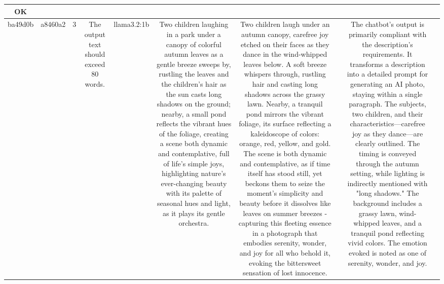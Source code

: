 \begin{table}[h!]
\begin{tabular}{|c|c|c|c|c|c|c|c|c|c|}
OK & \\
\hline
ba49d0b & a8460a2 & 3 & The output text should exceed 80 words. & llama3.2:1b & Two children laughing in a park under a canopy of colorful autumn leaves as a gentle breeze sweeps by, rustling the leaves and the children's hair as the sun casts long shadows on the ground; nearby, a small pond reflects the vibrant hues of the foliage, creating a scene both dynamic and contemplative, full of life's simple joys, highlighting nature's ever-changing beauty with its palette of seasonal hues and light, as it plays its gentle orchestra. & Two children laugh under an autumn canopy, carefree joy etched on their faces as they dance in the wind-whipped leaves below. A soft breeze whispers through, rustling hair and casting long shadows across the grassy lawn. Nearby, a tranquil pond mirrors the vibrant foliage, its surface reflecting a kaleidoscope of colors: orange, red, yellow, and gold. The scene is both dynamic and contemplative, as if time itself has stood still, yet beckons them to seize the moment's simplicity and beauty before it dissolves like leaves on summer breezes - capturing this fleeting essence in a photograph that embodies serenity, wonder, and joy for all who behold it, evoking the bittersweet sensation of lost innocence. &  & The chatbot's output is primarily compliant with the description's requirements. It transforms a description into a detailed prompt for generating an AI photo, staying within a single paragraph. The subjects, two children, and their characteristics—carefree joy as they dance—are clearly outlined. The timing is conveyed through the autumn setting, while lighting is indirectly mentioned with "long shadows." The background includes a grassy lawn, wind-whipped leaves, and a tranquil pond reflecting vivid colors. The emotion evoked is noted as one of serenity, wonder, and joy. 


\end{tabular}
\end{table}
